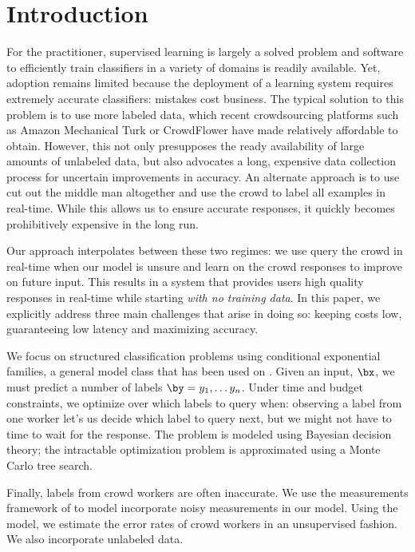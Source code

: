 \section{Introduction}

For the practitioner, supervised learning is largely a solved problem and software to efficiently train classifiers in a variety of domains is readily available.
Yet, adoption remains limited because the deployment of a learning system requires extremely accurate classifiers: mistakes cost business.
The typical solution to this problem is to use more labeled data, which recent crowdsourcing platforms such as Amazon Mechanical Turk or CrowdFlower have made relatively affordable to obtain.
However, this not only presupposes the ready availability of large amounts of unlabeled data, but also advocates a long, expensive data collection process for uncertain improvements in accuracy.
An alternate approach is to use cut out the middle man altogether and use the crowd to label all examples in real-time\cite{cheng2015flock}. 
While this allows us to ensure accurate responses, it quickly becomes prohibitively expensive in the long run. 

Our approach interpolates between these two regimes: we use query the crowd in real-time when our model is unsure and learn on the crowd responses to improve on future input.
This results in a system that provides users high quality responses in real-time while starting {\em with no training data}.
In this paper, we explicitly address three main challenges that arise in doing so: keeping costs low, guaranteeing low latency and maximizing accuracy.

We focus on structured classification problems using conditional exponential families, a general model class that has been used on .
Given an input, $\bx$, we must predict a number of labels $\by = y_1, \ldots y_n$.
Under time and budget constraints, we optimize over which labels to query when: observing a label from one worker let's us decide which label to query next, but we might not have to time to wait for the response.
The problem is modeled using Bayesian decision theory; the intractable optimization problem is approximated using a Monte Carlo tree search.

Finally, labels from crowd workers are often inaccurate. We use the measurements framework of\cite{liang09measurements} to model incorporate noisy measurements in our model. Using the model, we estimate the error rates of crowd workers in an unsupervised fashion. We also incorporate unlabeled data.

